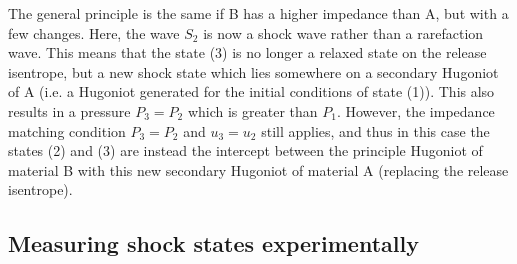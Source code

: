 The general principle is the same if B has a higher impedance than A, but with a few changes. Here, the wave $S_2$ is now a shock wave rather than a rarefaction wave. This means that the state (3) is no longer a relaxed state on the release isentrope, but a new shock state which lies somewhere on a secondary Hugoniot of A (i.e. a Hugoniot generated for the initial conditions of state (1)). This also results in a pressure $P_3 = P_2$ which is greater than $P_1$. However, the impedance matching condition $P_3 = P_2$ and $u_3 = u_2$ still applies, and thus in this case the states (2) and (3) are instead the intercept between the principle Hugoniot of material B with this new secondary Hugoniot of material A (replacing the release isentrope).

\subsection{Measuring shock states experimentally \label{IMTheoryMeasurements}}




